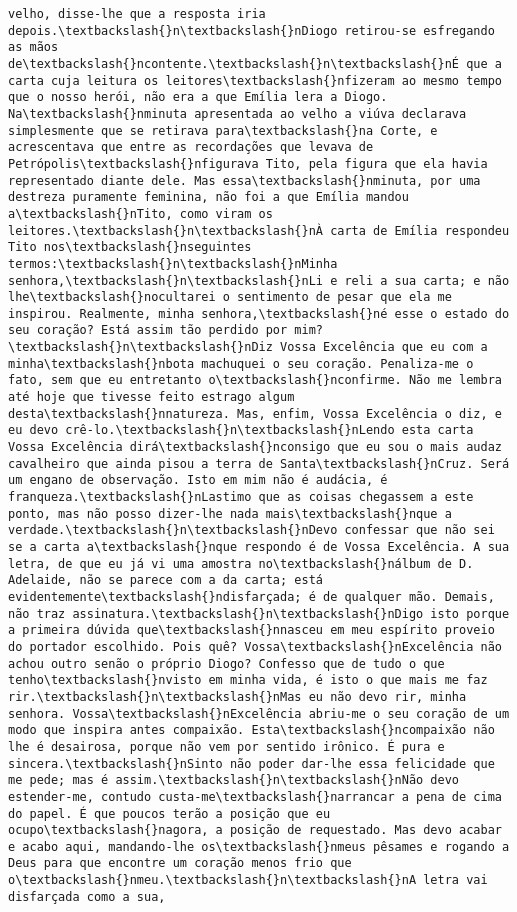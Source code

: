 \documentclass[11pt]{article}
\begin{document}
\begin{Verbatim}[commandchars=\\\{\}]
velho, disse-lhe que a resposta iria depois.\textbackslash{}n\textbackslash{}nDiogo retirou-se esfregando as mãos de\textbackslash{}ncontente.\textbackslash{}n\textbackslash{}nÉ que a carta cuja leitura os leitores\textbackslash{}nfizeram ao mesmo tempo que o nosso herói, não era a que Emília lera a Diogo. Na\textbackslash{}nminuta apresentada ao velho a viúva declarava simplesmente que se retirava para\textbackslash{}na Corte, e acrescentava que entre as recordações que levava de Petrópolis\textbackslash{}nfigurava Tito, pela figura que ela havia representado diante dele. Mas essa\textbackslash{}nminuta, por uma destreza puramente feminina, não foi a que Emília mandou a\textbackslash{}nTito, como viram os leitores.\textbackslash{}n\textbackslash{}nÀ carta de Emília respondeu Tito nos\textbackslash{}nseguintes termos:\textbackslash{}n\textbackslash{}nMinha senhora,\textbackslash{}n\textbackslash{}nLi e reli a sua carta; e não lhe\textbackslash{}nocultarei o sentimento de pesar que ela me inspirou. Realmente, minha senhora,\textbackslash{}né esse o estado do seu coração? Está assim tão perdido por mim?\textbackslash{}n\textbackslash{}nDiz Vossa Excelência que eu com a minha\textbackslash{}nbota machuquei o seu coração. Penaliza-me o fato, sem que eu entretanto o\textbackslash{}nconfirme. Não me lembra até hoje que tivesse feito estrago algum desta\textbackslash{}nnatureza. Mas, enfim, Vossa Excelência o diz, e eu devo crê-lo.\textbackslash{}n\textbackslash{}nLendo esta carta Vossa Excelência dirá\textbackslash{}nconsigo que eu sou o mais audaz cavalheiro que ainda pisou a terra de Santa\textbackslash{}nCruz. Será um engano de observação. Isto em mim não é audácia, é franqueza.\textbackslash{}nLastimo que as coisas chegassem a este ponto, mas não posso dizer-lhe nada mais\textbackslash{}nque a verdade.\textbackslash{}n\textbackslash{}nDevo confessar que não sei se a carta a\textbackslash{}nque respondo é de Vossa Excelência. A sua letra, de que eu já vi uma amostra no\textbackslash{}nálbum de D. Adelaide, não se parece com a da carta; está evidentemente\textbackslash{}ndisfarçada; é de qualquer mão. Demais, não traz assinatura.\textbackslash{}n\textbackslash{}nDigo isto porque a primeira dúvida que\textbackslash{}nnasceu em meu espírito proveio do portador escolhido. Pois quê? Vossa\textbackslash{}nExcelência não achou outro senão o próprio Diogo? Confesso que de tudo o que tenho\textbackslash{}nvisto em minha vida, é isto o que mais me faz rir.\textbackslash{}n\textbackslash{}nMas eu não devo rir, minha senhora. Vossa\textbackslash{}nExcelência abriu-me o seu coração de um modo que inspira antes compaixão. Esta\textbackslash{}ncompaixão não lhe é desairosa, porque não vem por sentido irônico. É pura e sincera.\textbackslash{}nSinto não poder dar-lhe essa felicidade que me pede; mas é assim.\textbackslash{}n\textbackslash{}nNão devo estender-me, contudo custa-me\textbackslash{}narrancar a pena de cima do papel. É que poucos terão a posição que eu ocupo\textbackslash{}nagora, a posição de requestado. Mas devo acabar e acabo aqui, mandando-lhe os\textbackslash{}nmeus pêsames e rogando a Deus para que encontre um coração menos frio que o\textbackslash{}nmeu.\textbackslash{}n\textbackslash{}nA letra vai disfarçada como a sua, 
\end{Verbatim}
\end{document}
